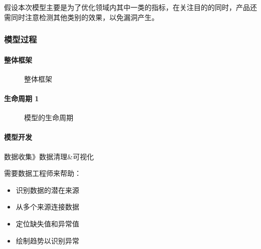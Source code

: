 \documentclass[letterpaper,11pt,english]{sphinxmanual}
\begin{document}
假设本次模型主要是为了优化领域内其中一类的指标，在关注目的的同时，产品还需同时注意检测其他类别的效果，以免漏洞产生。


\subsubsection{模型过程}
\label{\detokenize{chapter_project/Model Process:id1}}\label{\detokenize{chapter_project/Model Process::doc}}

\paragraph{整体框架}
\label{\detokenize{chapter_project/Model Process:id2}}
\begin{figure}[H]
\centering
\capstart

\noindent{}
\caption{整体框架}\label{\detokenize{chapter_project/Model Process:id11}}\end{figure}


\paragraph{生命周期 1\sphinxfootnotemark[731]}
\label{\detokenize{chapter_project/Model Process:id3}}%
\begin{footnotetext}[731]\sphinxAtStartFootnote
{}
%
\end{footnotetext}\ignorespaces 
\begin{figure}[H]
\centering
\capstart

\noindent{}
\caption{模型的生命周期}\label{\detokenize{chapter_project/Model Process:id12}}\end{figure}


\paragraph{模型开发}
\label{\detokenize{chapter_project/Model Process:id4}}
数据收集\sphinxhyphen{}》数据清理\&可视化

需要数据工程师来帮助：
\begin{itemize}
\item {} 
识别数据的潜在来源

\item {} 
从多个来源连接数据

\item {} 
定位缺失值和异常值

\item {} 
绘制趋势以识别异常

\end{itemize}
\end{document}
